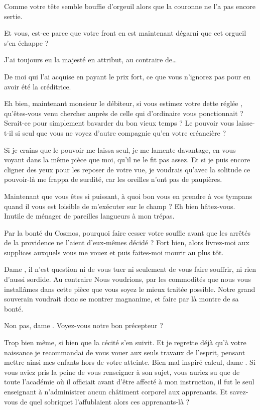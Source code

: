 \begin{drama}
  \reinespeaks Comme votre tête semble bouffie d’orgeuil alors que la couronne ne l’a pas encore sertie.

  \elenaspeaks Et vous, est-ce parce que votre front en est maintenant dégarni que cet orgueil s’en échappe ?

  \reinespeaks J’ai toujours eu la majesté en attribut, au contraire de…

  \elenaspeaks De moi qui l’ai acquise en payant le prix fort, ce que vous n’ignorez pas pour en avoir été la créditrice.

  \reinespeaks Eh bien, maintenant monsieur le débiteur, si vous estimez votre dette réglée , qu’êtes-vous venu chercher auprès de celle qui d’ordinaire vous ponctionnait ? Serait-ce pour simplement bavarder du bon vieux temps ? Le pouvoir vous laisse-t-il si seul que vous ne voyez d’autre compagnie qu’en votre créancière ?

  \elenaspeaks Si je crains que le pouvoir me laissa seul, je me lamente davantage, en vous voyant dans la même pièce que moi, qu’il ne le fit pas assez. Et si je puis encore cligner des yeux pour les reposer de votre vue, je voudrais qu’avec la solitude ce pouvoir-là me frappa de surdité, car les oreilles n’ont pas de paupières.

  \reinespeaks Maintenant que vous êtes si puissant, à quoi bon vous en prendre à vos tympans quand il vous est loisible de m’exécuter sur le champ ? Eh bien hâtez-vous. Inutile de ménager de pareilles langueurs à mon trépas.

  \elenaspeaks Par la bonté du Cosmos, pourquoi faire cesser votre souffle avant que les arrêtés de la providence ne l’aient d’eux-mêmes décidé ?
  \reinespeaks Fort bien, alors livrez-moi aux supplices auxquels vous me vouez et puis faites-moi mourir au plus tôt.

  \elenaspeaks Dame \reine, il n’est question ni de vous tuer ni seulement de vous faire souffrir, ni rien d’aussi sordide. Au contraire Nous voudrions, par les commodités que nous vous installâmes dans cette pièce que vous soyez le mieux traitée possible.
  \reinespeaks Notre grand souverain voudrait donc se montrer magnanime, et faire par là montre de sa bonté.

  \elenaspeaks {} Non pas, dame \reine. Voyez-vous notre bon précepteur \alexas ?

  \reinespeaks Trop bien même, si bien que la cécité s’en suivit. Et je regrette déjà qu’à votre naissance je recommandai de vous vouer aux seuls travaux de l’esprit, pensant mettre ainsi mes enfants hors de votre atteinte.
  \elenaspeaks Bien mal inspiré calcul, dame \reine. Si vous aviez pris la peine de vous renseigner à son sujet, vous auriez su que de toute l’académie où il officiait avant d’être affecté à mon instruction, il fut le seul enseignant à n’administrer aucun châtiment corporel aux apprenants. Et savez-vous de quel sobriquet l’affublaient alors ces apprenants-là ?


\end{drama}
